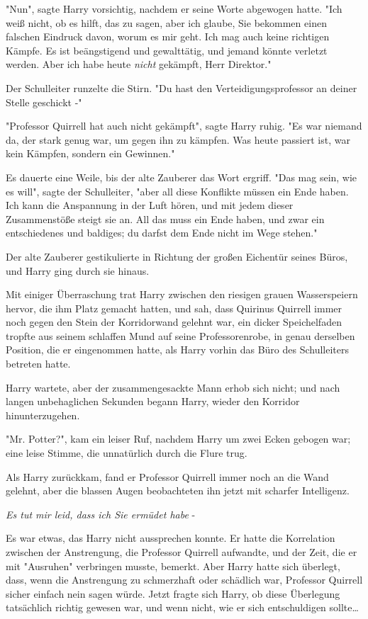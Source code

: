 {"Nun", sagte Harry vorsichtig, nachdem er seine Worte abgewogen hatte. "Ich weiß nicht, ob es hilft, das zu sagen, aber ich glaube, Sie bekommen einen falschen Eindruck davon, worum es mir geht. Ich mag auch keine richtigen Kämpfe. Es ist beängstigend und gewalttätig, und jemand könnte verletzt werden. Aber ich habe heute \emph{nicht} gekämpft, Herr Direktor."

Der Schulleiter runzelte die Stirn. "Du hast den Verteidigungsprofessor an deiner Stelle geschickt -"

"Professor Quirrell hat auch nicht gekämpft", sagte Harry ruhig. "Es war niemand da, der stark genug war, um gegen ihn zu kämpfen. Was heute passiert ist, war kein Kämpfen, sondern ein Gewinnen."

Es dauerte eine Weile, bis der alte Zauberer das Wort ergriff. "Das mag sein, wie es will", sagte der Schulleiter, "aber all diese Konflikte müssen ein Ende haben. Ich kann die Anspannung in der Luft hören, und mit jedem dieser Zusammenstöße steigt sie an. All das muss ein Ende haben, und zwar ein entschiedenes und baldiges; du darfst dem Ende nicht im Wege stehen."

Der alte Zauberer gestikulierte in Richtung der großen Eichentür seines Büros, und Harry ging durch sie hinaus.

Mit einiger Überraschung trat Harry zwischen den riesigen grauen Wasserspeiern hervor, die ihm Platz gemacht hatten, und sah, dass Quirinus Quirrell immer noch gegen den Stein der Korridorwand gelehnt war, ein dicker Speichelfaden tropfte aus seinem schlaffen Mund auf seine Professorenrobe, in genau derselben Position, die er eingenommen hatte, als Harry vorhin das Büro des Schulleiters betreten hatte.

Harry wartete, aber der zusammengesackte Mann erhob sich nicht; und nach langen unbehaglichen Sekunden begann Harry, wieder den Korridor hinunterzugehen.

"Mr. Potter?", kam ein leiser Ruf, nachdem Harry um zwei Ecken gebogen war; eine leise Stimme, die unnatürlich durch die Flure trug.

Als Harry zurückkam, fand er Professor Quirrell immer noch an die Wand gelehnt, aber die blassen Augen beobachteten ihn jetzt mit scharfer Intelligenz.

\emph{Es tut mir leid, dass ich Sie ermüdet habe} -

Es war etwas, das Harry nicht aussprechen konnte. Er hatte die Korrelation zwischen der Anstrengung, die Professor Quirrell aufwandte, und der Zeit, die er mit "Ausruhen" verbringen musste, bemerkt. Aber Harry hatte sich überlegt, dass, wenn die Anstrengung zu schmerzhaft oder schädlich war, Professor Quirrell sicher einfach nein sagen würde. Jetzt fragte sich Harry, ob diese Überlegung tatsächlich richtig gewesen war, und wenn nicht, wie er sich entschuldigen sollte…

}

